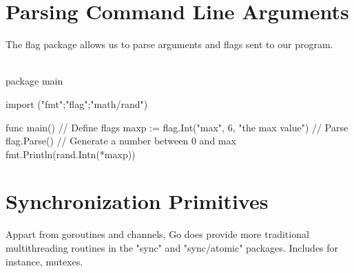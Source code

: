 \documentclass[twoside,a4paper,english]{report}
\begin{document}
\section{Parsing Command Line Arguments}
The flag package allows us to parse arguments and flags sent to our program. \\\\
\begin{go}
package main

import ("fmt";"flag";"math/rand")

func main() {
    // Define flags
    maxp := flag.Int("max", 6, "the max value")
    // Parse
    flag.Parse()
    // Generate a number between 0 and max
    fmt.Println(rand.Intn(*maxp))
}  
\end{go} 
\section{Synchronization Primitives}
Appart from goroutines and channels, Go does provide more traditional multithreading routines in the "sync" and "sync/atomic" packages. Includes for instance, mutexes.

\nocite{*}

\newpage


\end{document}
